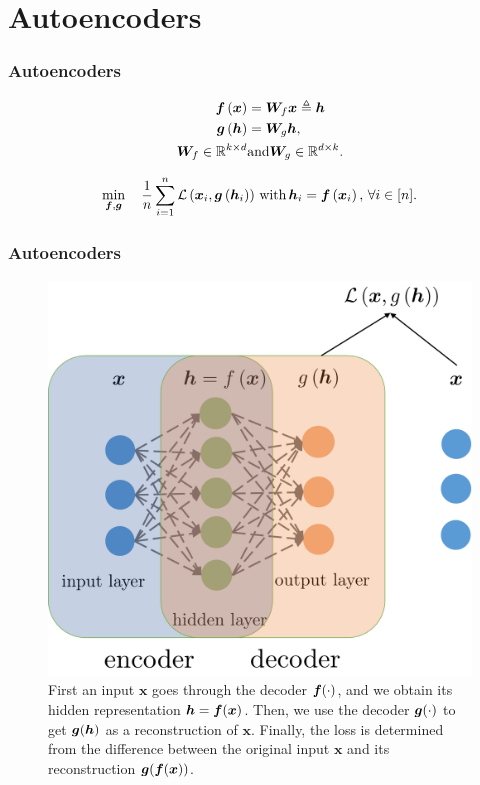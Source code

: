 \documentclass[presentation]{beamer}
\begin{document}
\section{Autoencoders}

\begin{frame}
    \frametitle{Autoencoders}

    \begin{align}
        \text{\boldmath $f$}\left(\bm{x}\right)& =\bm{W}_f\bm{x}\triangleq \text{\boldmath $h$} \\
        \text{\boldmath $g$}\left(\bm{h}\right)& =\bm{W}_g\bm{h}, \\
        \bm{W}_f\in\mathbb{R}^{k\times d} & \text{and}  \bm{W}_g\in\mathbb{R}^{d\times k}.
    \end{align}
    \pause
    
    \begin{equation}
        \min _{\text{\boldmath $f$},\text{\boldmath $g$}} \quad\frac{1}{n}\sum_{i=1}^{n}\mathcal{L}\left(\bm{x}_{i},\text{\boldmath $g$}\left(\bm{h}_{i}\right)\right) \, \text{with} \, \bm{h}_{i}=\text{\boldmath $f$}\left(\bm{x}_{i}\right), \, \forall i \in [n].  \label{eq:AE}
    \end{equation}
\end{frame}

\begin{frame}
    \frametitle{Autoencoders}

    
    \begin{figure}
        \centering\includegraphics[scale=0.2]{AE}
        \caption{First an input $\bm{x}$ goes through the decoder $\text{\boldmath $f$}(\cdot)$, and we obtain its hidden representation $\bm{h}= \text{\boldmath $f$}(\bm{x})$. Then, we use the decoder $\text{\boldmath $g$}(\cdot)$ to get $\text{\boldmath $g$}(\bm{h})$ as a reconstruction of $\bm{x}$. Finally, the loss is determined from the difference between the original input $\bm{x}$ and its reconstruction $\text{\boldmath $g$}(\text{\boldmath $f$}(\bm{x}))$.}\label{fig:AE} %
    \end{figure}

\end{frame}
\end{document}
